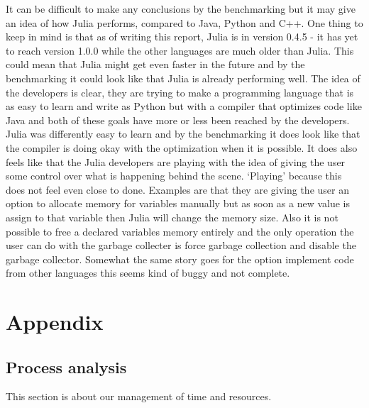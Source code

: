 \documentclass[a4paper, 11pt, titlepage]{article}
\begin{document}
It can be difficult to make any conclusions by the benchmarking but it may give an idea of how Julia performs, compared to Java, Python and C++. One thing to keep in mind is that as of writing this report, Julia is in version 0.4.5 - it has yet to reach version 1.0.0 while the other languages are much older than Julia. This could mean that Julia might get even faster in the future and by the benchmarking it could look like that Julia is already performing well. The idea of the developers is clear, they are trying to make a programming language that is as easy to learn and write as Python but with a compiler that optimizes code like Java and both of these goals have more or less been reached by the developers. Julia was differently easy to learn and by the benchmarking it does look like that the compiler is doing okay with the optimization when it is possible. It does also feels like that the Julia developers are playing with the idea of giving the user some control over what is happening behind the scene. ‘Playing’ because this does not feel even close to done. Examples are that they are giving the user an option to allocate memory for variables manually but as soon as a new value is assign to that variable then Julia will change the memory size. Also it is not possible to free a declared variables memory entirely and the only operation the user can do with the garbage collecter is force garbage collection and disable the garbage collector. Somewhat the same story goes for the option implement code from other languages this seems kind of buggy and not complete.

\newpage
\section{Appendix}
\subsection{Process analysis}
This section is about our management of time and resources.
\end{document}
